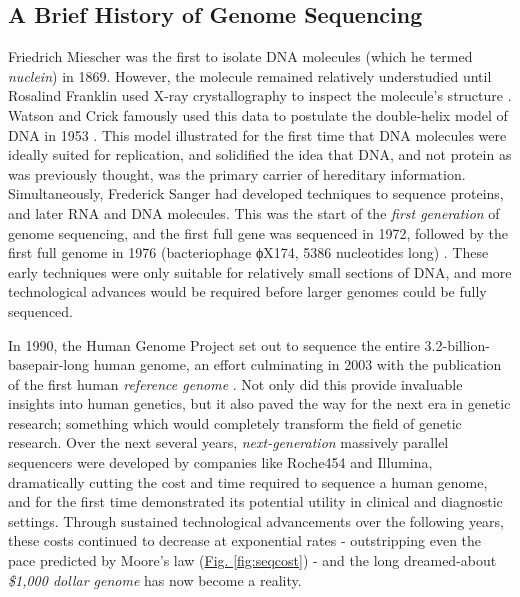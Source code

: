 \begin{justify}
\subsection{A Brief History of Genome Sequencing}
Friedrich Miescher was the first to isolate DNA molecules (which he termed \emph{nuclein}) in 1869. However, the molecule remained relatively understudied until Rosalind Franklin used X-ray crystallography to inspect the molecule's structure \cite{elkin2003rosalind}. Watson and Crick famously used this data to postulate the double-helix model of DNA in 1953 \cite{watson1953molecular}. This model illustrated for the first time that DNA molecules were ideally suited for replication, and solidified the idea that DNA, and not protein as was previously thought, was the primary carrier of hereditary information. Simultaneously, Frederick Sanger had developed techniques to sequence proteins, and later RNA and DNA molecules. This was the start of the \emph{first generation} of genome sequencing, and the first full gene was sequenced in 1972, followed by the first full genome in 1976 (bacteriophage ϕX174, 5386 nucleotides long) \cite{sanger1977dna}. These early techniques were only suitable for relatively small sections of DNA, and more technological advances would be required before larger genomes could be fully sequenced.

In 1990, the Human Genome Project \cite{olson1993human} set out to sequence the entire 3.2-billion-basepair-long human genome, an effort culminating in 2003 with the publication of the first human \textit{reference genome} \cite{international2004finishing}. Not only did this provide invaluable insights into human genetics, but it also paved the way for the next era in genetic research; something which would completely transform the field of genetic research. Over the next several years, \emph{next-generation} massively parallel sequencers were developed by companies like Roche454 and Illumina, dramatically cutting the cost and time required to sequence a human genome, and for the first time demonstrated its potential utility in clinical and diagnostic settings. Through sustained technological advancements over the following years, these costs continued to decrease at exponential rates - outstripping even the pace predicted by Moore's law (\hyperref[fig:seqcost]{Fig. \ref{fig:seqcost}}) - and the long dreamed-about \textit{\$1,000 dollar genome} \cite{thousanddollargenome} \cite{sequencingcostsNHGRI} has now become a reality.


\end{justify}
